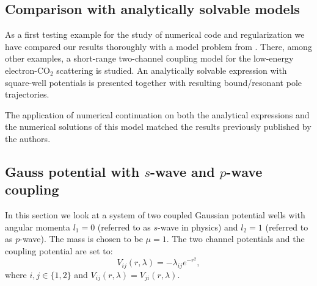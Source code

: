 \documentclass[mathpazo]{cicp}
\begin{document}
\subsection{Comparison with analytically solvable models}
\label{sec:model1}
As a first testing example for the study of numerical code and regularization we have compared our results thoroughly with a model problem from \cite{Vanroose2002}. There, among 
other examples, a short-range two-channel coupling model for the low-energy electron-CO$_{2}$ scattering is studied. An analytically solvable expression with square-well potentials 
is presented together with resulting bound/resonant pole trajectories.

The application of numerical continuation on both the analytical expressions and the numerical solutions of this model matched the results previously published by the authors. 

\subsection{Gauss potential with $s$-wave and $p$-wave coupling}
\label{sec:model2}
In this section we look at a system of two coupled Gaussian potential wells with angular momenta $l_{1}=0$ (referred to as $s$-wave in physics) and $l_{2}=1$ (referred to as $p$-wave). The mass is chosen to be $\mu=1$.
The two channel potentials and the coupling potential are set to:
\[
	V_{ij}(r,\lambda) = -\lambda_{ij}e^{-r^{2}},
\]
where $i,j\in\{1,2\}$ and $V_{ij}(r,\lambda) = V_{ji}(r,\lambda)$.
\end{document}
